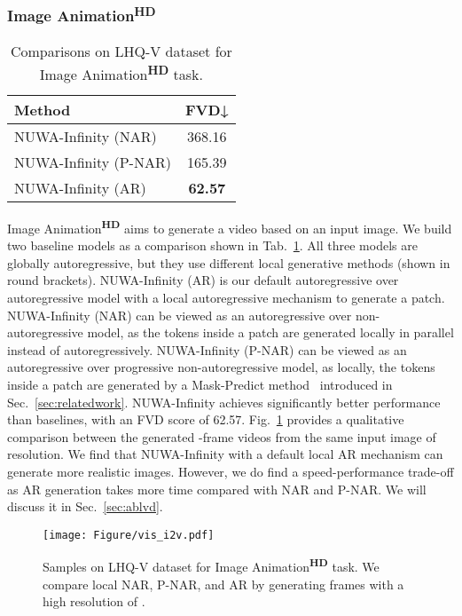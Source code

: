 \documentclass{article}
\begin{document}
\subsubsection{Image Animation\textsuperscript{\textbf{HD}}}
\begin{table}
\centering
\begin{tabular}{lc}
\toprule
Method        & FVD↓           \\
\midrule
NUWA-Infinity (NAR)   &368.16          \\
NUWA-Infinity (P-NAR) & 165.39          \\
NUWA-Infinity (AR) & \textbf{62.57} \\
\bottomrule
\end{tabular}
\caption{Comparisons on LHQ-V dataset for Image Animation\textsuperscript{\textbf{HD}} task.}
\label{tab:i2v_task}
\end{table}
Image Animation\textsuperscript{\textbf{HD}} aims to generate a video based on an input image. We build two baseline models as a comparison shown in Tab.~\ref{tab:i2v_task}. All three models are globally autoregressive, but they use different local generative methods (shown in round brackets). NUWA-Infinity (AR) is our default autoregressive over autoregressive model with a local autoregressive mechanism to generate a patch. NUWA-Infinity (NAR) can be viewed as an autoregressive over non-autoregressive model, as the tokens inside a patch are generated locally in parallel instead of autoregressively. NUWA-Infinity (P-NAR) can be viewed as an autoregressive over progressive non-autoregressive model, as locally, the tokens inside a patch are generated by a Mask-Predict method~\cite{changMaskGITMaskedGenerative2022} introduced in Sec.~\ref{sec:relatedwork}. NUWA-Infinity achieves significantly better performance than baselines, with an FVD score of 62.57. Fig.~\ref{fig:vis_i2v} provides a qualitative comparison between the generated -frame videos from the same input image of  resolution. We find that NUWA-Infinity with a default local AR mechanism can generate more realistic images. However, we do find a speed-performance trade-off as AR generation takes more time compared with NAR and P-NAR. We will discuss it in Sec.~\ref{sec:ablvd}.




\begin{figure}[h]
    \centering
    \texttt{[image: Figure/vis\_i2v.pdf]}
    \caption{Samples on LHQ-V dataset for Image Animation\textsuperscript{\textbf{HD}} task. We compare local NAR, P-NAR, and AR by generating  frames with a high resolution of .}
    \label{fig:vis_i2v}
	\vspace{-3mm}
\end{figure}
\end{document}
